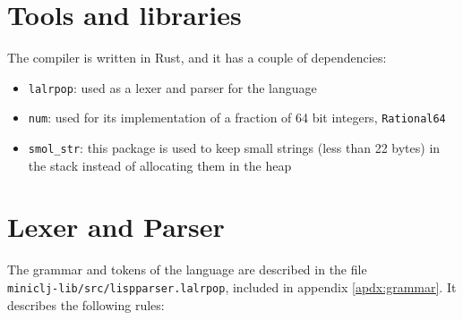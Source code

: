 \documentclass[11pt]{scrreprt}
\begin{document}
\section{Tools and libraries}
The compiler is written in Rust, and it has a couple of dependencies:
\begin{itemize}
  \item \texttt{lalrpop}: used as a lexer and parser for the language
  \item \texttt{num}: used for its implementation of a fraction of 64 bit integers, \texttt{Rational64}
  \item \texttt{smol\_str}: this package is used to keep small strings (less than 22 bytes) in the stack instead of allocating them in the heap
\end{itemize}

\section{Lexer and Parser}
The grammar and tokens of the language are described in the file\\\texttt{miniclj-lib/src/lispparser.lalrpop}, included in appendix \ref{apdx:grammar}. It describes the following rules:
\end{document}
